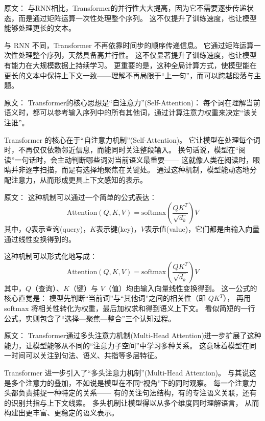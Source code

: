 原文：
与RNN相比，Transformer的并行性大大提高，因为它不需要逐步传递状态，而是通过矩阵运算一次性处理整个序列。  
这不仅提升了训练速度，也让模型能够处理更长的文本。  

与 RNN 不同，Transformer 不再依靠时间步的顺序传递信息。  
它通过矩阵运算一次性处理整个序列，天然具备高并行性。  
这不仅显著提升了训练速度，也让模型有能力在大规模数据上持续学习。  
更重要的是，这种全局计算方式，使模型能在更长的文本中保持上下文一致——理解不再局限于“上一句”，而可以跨越段落与主题。  



原文：
Transformer的核心思想是“自注意力”(Self-Attention)：  
每个词在理解当前语义时，都可以参考输入序列中的所有其他词，通过计算注意力权重来决定“该关注谁”。  

Transformer 的核心在于“自注意力机制”(Self-Attention)。  
它让模型在处理每个词时，不再仅仅依赖邻近信息，而能同时关注整段输入。  
换句话说，模型在“阅读”一句话时，会主动判断哪些词对当前语义最重要——  
这就像人类在阅读时，眼睛并非逐字扫描，而是有选择地聚焦在关键处。  
通过这种机制，模型能动态地分配注意力，从而形成更具上下文感知的表示。  



原文：
这种机制可以通过一个简单的公式表达：  
\[
\text{Attention}(Q,K,V)=\text{softmax}\left(\frac{QK^T}{\sqrt{d_k}}\right)V
\]  
其中，$Q$表示查询(query)，$K$表示键(key)，$V$表示值(value)，它们都是由输入向量通过线性变换得到的。  

这种机制可以形式化地写成：  
\[
\text{Attention}(Q,K,V)=\text{softmax}\left(\frac{QK^T}{\sqrt{d_k}}\right)V
\]  
其中，$Q$（查询）、$K$（键）与 $V$（值）均由输入向量线性变换得到。  
这一公式的核心直觉是：  
模型先判断“当前词”与“其他词”之间的相关性（即 $QK^T$），  
再用 softmax 将相关性转化为权重，最后加权求和得到语义上下文。  
看似简短的一行公式，实则包含了“选择—聚焦—整合”三个认知过程。  



原文：
Transformer通过多头注意力机制(Multi-Head Attention)进一步扩展了这种能力，让模型能够从不同的“注意力子空间”中学习多种关系。  
这意味着模型在同一时间可以关注到句法、语义、共指等多层特征。  

Transformer 进一步引入了“多头注意力机制”(Multi-Head Attention)。  
与其说这是多个注意力的叠加，不如说是模型在不同“视角”下的同时观察。  
每一个注意力头都负责捕捉一种特定的关系——  
有的关注句法结构，有的专注语义关联，还有的识别共指与上下文线索。  
多头机制让模型得以从多个维度同时理解语言，  
从而构建出更丰富、更稳定的语义表示。  



